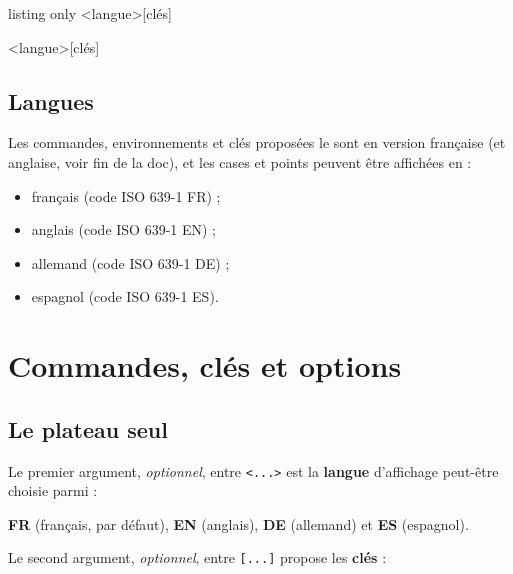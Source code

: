 \documentclass{article}
\newcommand\Cle[1]{{\bfseries\sffamily\textlangle #1\textrangle}}
\begin{document}
\begin{PresentationCode}{listing only}
\PlateauScrabble<langue>[clés]

\begin{EnvScrabbleFR}<langue>[clés]
\end{EnvScrabbleFR}
\end{PresentationCode}

\subsection{Langues}

Les \textsf{commandes}, \textsf{environnements} et \textsf{clés} proposées le sont en version \textsf{française} (et \textsf{anglaise}, voir fin de la doc), et les cases et points peuvent être affichées en :

\begin{itemize}
	\item français (code ISO 639-1 FR) ;
	\item anglais (code ISO 639-1 EN) ;
	\item allemand (code ISO 639-1 DE) ;
	\item espagnol (code ISO 639-1 ES).
\end{itemize}

\pagebreak

\section{Commandes, clés et options}

\subsection{Le plateau seul}

Le premier argument, \textit{optionnel}, entre \texttt{<...>} est la \Cle{langue} d'affichage peut-être choisie parmi :

\hfill\Cle{FR} (français, par défaut), \Cle{EN} (anglais), \Cle{DE} (allemand) et \Cle{ES} (espagnol).\hfill~

\smallskip

Le second argument, \textit{optionnel}, entre \texttt{[...]} propose les \Cle{clés} :
\end{document}
